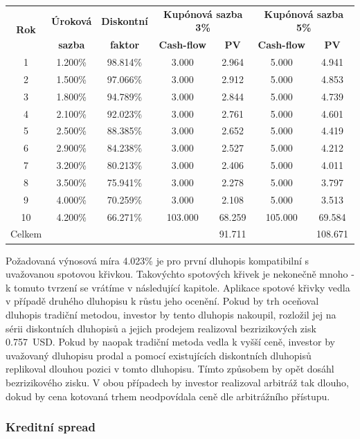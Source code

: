 \documentclass[a4paper]{book}
\begin{document}
\begin{center}
\begin{tabular}{c c c c c c c}
\multirow{2}{*}{\textbf{Rok}} & \textbf{Úroková} & \textbf{Diskontní} & \multicolumn{2}{c}{\textbf{Kupónová sazba 3\%}} & \multicolumn{2}{c}{\textbf{Kupónová sazba 5\%}}\\
 & \textbf{sazba} & \textbf{faktor} & \textbf{Cash-flow} & \textbf{PV} & \textbf{Cash-flow} & \textbf{PV}\\
\hline
1  & 1.200\% & 98.814\% &   3.000 &  2.964 &   5.000 &   4.941\\
2  & 1.500\% & 97.066\% &   3.000 &  2.912 &   5.000 &   4.853\\
3  & 1.800\% & 94.789\% &   3.000 &  2.844 &   5.000 &   4.739\\
4  & 2.100\% & 92.023\% &   3.000 &  2.761 &   5.000 &   4.601\\
5  & 2.500\% & 88.385\% &   3.000 &  2.652 &   5.000 &   4.419\\
6  & 2.900\% & 84.238\% &   3.000 &  2.527 &   5.000 &   4.212\\
7  & 3.200\% & 80.213\% &   3.000 &  2.406 &   5.000 &   4.011\\
8  & 3.500\% & 75.941\% &   3.000 &  2.278 &   5.000 &   3.797\\
9  & 4.000\% & 70.259\% &   3.000 &  2.108 &   5.000 &   3.513\\
10 & 4.200\% & 66.271\% & 103.000 & 68.259 & 105.000 &  69.584\\
Celkem &     &          &         & 91.711 &         & 108.671
\end{tabular}
\end{center}
Požadovaná výnosová míra 4.023\% je pro první dluhopis kompatibilní s uvažovanou spotovou křivkou. Takovýchto spotových křivek je nekonečně mnoho - k tomuto tvrzení se vrátíme v následující kapitole. Aplikace spotové křivky vedla v případě druhého dluhopisu k růstu jeho ocenění. Pokud by trh oceňoval dluhopis tradiční metodou, investor by tento dluhopis nakoupil, rozložil jej na sérii diskontních dluhopisů a jejich prodejem realizoval bezrizikových zisk 0.757~USD. Pokud by naopak tradiční metoda vedla k vyšší ceně, investor by uvažovaný dluhopisu prodal a pomocí existujících diskontních dluhopisů replikoval dlouhou pozici v tomto dluhopisu. Tímto způsobem by opět dosáhl bezrizikového zisku. V obou případech by investor realizoval arbitráž tak dlouho, dokud by cena kotovaná trhem neodpovídala ceně dle arbitrážního přístupu.

\subsubsection{Kreditní spread}
\end{document}
